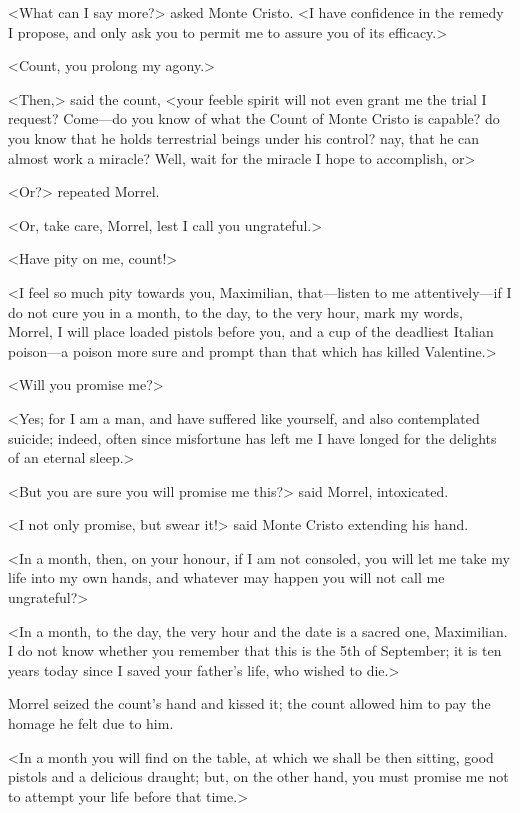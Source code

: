  <What can I say more?> asked Monte Cristo. <I have confidence in the remedy I propose, and only ask you to permit me to assure you of its efficacy.> 

 <Count, you prolong my agony.> 

 <Then,> said the count, <your feeble spirit will not even grant me the trial I request? Come—do you know of what the Count of Monte Cristo is capable? do you know that he holds terrestrial beings under his control? nay, that he can almost work a miracle? Well, wait for the miracle I hope to accomplish, or\longdash> 

 <Or?> repeated Morrel. 

 <Or, take care, Morrel, lest I call you ungrateful.> 

 <Have pity on me, count!> 

 <I feel so much pity towards you, Maximilian, that—listen to me attentively—if I do not cure you in a month, to the day, to the very hour, mark my words, Morrel, I will place loaded pistols before you, and a cup of the deadliest Italian poison—a poison more sure and prompt than that which has killed Valentine.> 

 <Will you promise me?> 

 <Yes; for I am a man, and have suffered like yourself, and also contemplated suicide; indeed, often since misfortune has left me I have longed for the delights of an eternal sleep.> 

 <But you are sure you will promise me this?> said Morrel, intoxicated. 

 <I not only promise, but swear it!> said Monte Cristo extending his hand. 

 <In a month, then, on your honour, if I am not consoled, you will let me take my life into my own hands, and whatever may happen you will not call me ungrateful?> 

 <In a month, to the day, the very hour and the date is a sacred one, Maximilian. I do not know whether you remember that this is the 5th of September; it is ten years today since I saved your father's life, who wished to die.> 

 Morrel seized the count's hand and kissed it; the count allowed him to pay the homage he felt due to him. 

 <In a month you will find on the table, at which we shall be then sitting, good pistols and a delicious draught; but, on the other hand, you must promise me not to attempt your life before that time.> 

